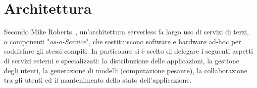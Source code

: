 \section{Architettura}
\label{sec:chapter_2_section_5}

Secondo Mike Roberts~\cite{Roberts}, un'architettura serverless fa largo uso di servizi di terzi,
o componenti "\emph{as-a-Service}", che sostituiscono software e hardware ad-hoc per soddisfare gli stessi compiti.
In particolare si è scelto di delegare i seguenti aspetti di servizi esterni e specializzati:
la distribuzione delle applicazioni, la gestione degli utenti, la generazione di modelli (computazione pesante),
la collaborazione tra gli utenti ed il mantenimento dello stato dell'applicazione.\\
